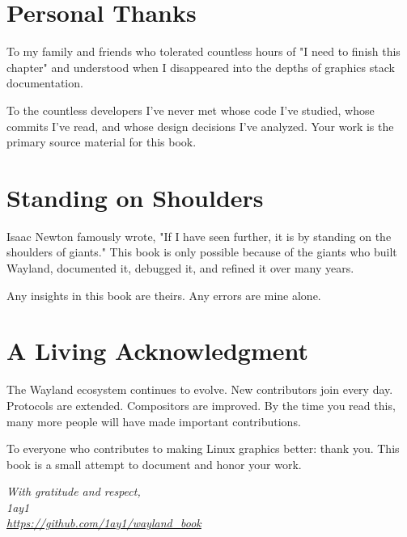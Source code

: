 \section*{Personal Thanks}

To my family and friends who tolerated countless hours of "I need to finish this chapter" and understood when I disappeared into the depths of graphics stack documentation.

To the countless developers I've never met whose code I've studied, whose commits I've read, and whose design decisions I've analyzed. Your work is the primary source material for this book.

\section*{Standing on Shoulders}

Isaac Newton famously wrote, "If I have seen further, it is by standing on the shoulders of giants." This book is only possible because of the giants who built Wayland, documented it, debugged it, and refined it over many years.

Any insights in this book are theirs. Any errors are mine alone.

\section*{A Living Acknowledgment}

The Wayland ecosystem continues to evolve. New contributors join every day. Protocols are extended. Compositors are improved. By the time you read this, many more people will have made important contributions.

To everyone who contributes to making Linux graphics better: thank you. This book is a small attempt to document and honor your work.

\vspace{2cm}

\begin{center}
\textit{With gratitude and respect,}\\
\vspace{0.5cm}
\textit{1ay1}\\
\textit{\url{https://github.com/1ay1/wayland_book}}
\end{center}

\clearpage
